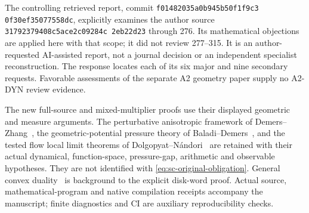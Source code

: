 \documentclass[11pt,reqno]{amsart}
\numberwithin{equation}{section}
\theoremstyle{definition}\newtheorem{definition}[theorem]{Definition}
\theoremstyle{remark}\newtheorem{remark}[theorem]{Remark}
\begin{document}
The controlling retrieved report, commit
\texttt{f0148203\allowbreak 5a0b945b\allowbreak 50f1f9c3\allowbreak
0f30ef35\allowbreak 077558dc},
explicitly examines the author source
\texttt{31792379\allowbreak 408c5ace\allowbreak 2c09284c\allowbreak
2eb22d23}
through 276.  Its mathematical objections are applied here with
that scope; it did not review 277--315.  It is an author-requested
AI-assisted report, not a journal decision or an independent
specialist reconstruction.  The response locates each of its six
major and nine secondary requests.  Favorable assessments of the
separate A2 geometry paper supply no A2-DYN review evidence.

The new full-source and mixed-multiplier proofs use their displayed
geometric and measure arguments.  The perturbative anisotropic
framework of Demers--Zhang~\cite{DZUniform}, the
geometric-potential pressure theory of
Baladi--Demers~\cite{BDPressure}, and the tested flow local limit
theorems of Dolgopyat--N\'andori~\cite{DNFlow} are retained with
their actual dynamical, function-space, pressure-gap, arithmetic
and observable hypotheses.  They are not identified with
\eqref{eq:sc-original-obligation}.  General convex
duality~\cite{BVNotes} is background to the explicit disk-word
proof.  Actual source, mathematical-program and native compilation
receipts accompany the manuscript; finite diagnostics and CI are
auxiliary reproducibility checks.
\end{document}
